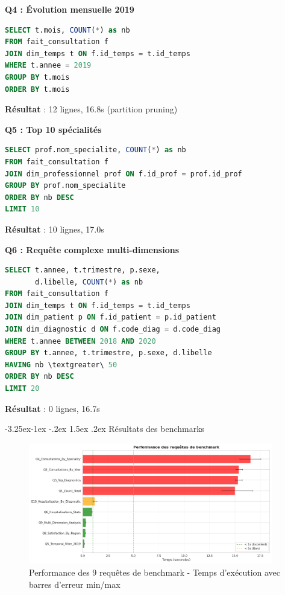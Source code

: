 \documentclass[12pt,a4paper]{article}
\makeatletter
\renewcommand\subsection{\@startsection{subsection}{2}{\z@}%
    {-3.25ex\@plus -1ex \@minus -.2ex}%
    {1.5ex \@plus .2ex}%
    {\normalfont\large\bfseries\color{blue!50!black}}}
\makeatother
\begin{document}
\textbf{Q4 : Évolution mensuelle 2019}
\begin{lstlisting}[language=SQL, basicstyle=\small\ttfamily]
SELECT t.mois, COUNT(*) as nb
FROM fait_consultation f
JOIN dim_temps t ON f.id_temps = t.id_temps
WHERE t.annee = 2019
GROUP BY t.mois
ORDER BY t.mois
\end{lstlisting}
\textbf{Résultat} : 12 lignes, 16.8s (partition pruning)

\textbf{Q5 : Top 10 spécialités}
\begin{lstlisting}[language=SQL, basicstyle=\small\ttfamily]
SELECT prof.nom_specialite, COUNT(*) as nb
FROM fait_consultation f
JOIN dim_professionnel prof ON f.id_prof = prof.id_prof
GROUP BY prof.nom_specialite
ORDER BY nb DESC
LIMIT 10
\end{lstlisting}
\textbf{Résultat} : 10 lignes, 17.0s

\textbf{Q6 : Requête complexe multi-dimensions}
\begin{lstlisting}[language=SQL, basicstyle=\small\ttfamily]
SELECT t.annee, t.trimestre, p.sexe,
       d.libelle, COUNT(*) as nb
FROM fait_consultation f
JOIN dim_temps t ON f.id_temps = t.id_temps
JOIN dim_patient p ON f.id_patient = p.id_patient
JOIN dim_diagnostic d ON f.code_diag = d.code_diag
WHERE t.annee BETWEEN 2018 AND 2020
GROUP BY t.annee, t.trimestre, p.sexe, d.libelle
HAVING nb \textgreater\ 50
ORDER BY nb DESC
LIMIT 20
\end{lstlisting}
\textbf{Résultat} : 0 lignes, 16.7s

\subsection{Résultats des benchmarks}

\begin{figure}[H]
\centering
\includegraphics[width=0.95\textwidth]{benchmark_performance_clean.png}
\caption{Performance des 9 requêtes de benchmark - Temps d'exécution avec barres d'erreur min/max}
\label{fig:perf_benchmarks}
\end{figure}
\end{document}

